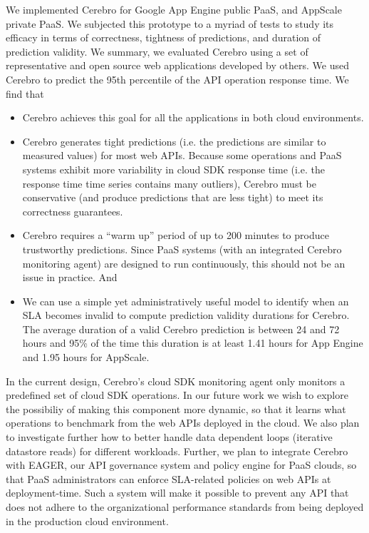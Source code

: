 We implemented Cerebro for Google App Engine public PaaS, 
and AppScale private PaaS. We subjected this
prototype to a myriad of tests to study its efficacy in terms of
correctness, tightness of predictions, and duration of prediction 
validity.  We summary, we evaluated Cerebro using a set of representative
and open source web applications developed by others.  We used Cerebro to
predict the 95th percentile of the API operation response time. 
We find that
\begin{itemize}
\vspace{-0.05in}
\item Cerebro achieves this goal for all the applications in both cloud environments.
\vspace{-0.05in}
\item Cerebro generates tight predictions (i.e.
the predictions are similar to measured values) for most web APIs.  Because
some operations and PaaS systems exhibit more variability in cloud SDK response
time (i.e. the response time time series contains many outliers), 
Cerebro must be conservative (and produce predictions that are less tight)
to meet its correctness guarantees.  
\vspace{-0.05in}
\item Cerebro requires a ``warm up'' period of up to 200 minutes to produce trustworthy predictions. Since PaaS systems (with an integrated Cerebro monitoring agent) are designed to run continuously, this should not be an issue in practice. And
\vspace{-0.05in}
\item We can use a simple yet administratively useful model to identify when an 
SLA becomes invalid to compute
prediction validity durations for Cerebro.  The average duration of a valid
Cerebro prediction is between 24 and 72 hours
and 95\% of the time this duration is at least 
1.41 hours for App Engine and 1.95 hours for AppScale.
\vspace{-0.05in}
\end{itemize}

In the current design, Cerebro's cloud SDK monitoring agent only monitors 
a predefined set of cloud SDK operations. In our future work we wish 
to explore the possibiliy of making this component more dynamic,
so that it learns what operations to benchmark from the web APIs 
deployed in the cloud. We also plan to investigate further how to better
handle data dependent loops (iterative datastore reads) for different workloads. 
Further, we plan
to integrate Cerebro with EAGER, our API governance system 
and policy engine for PaaS clouds, so 
that PaaS administrators can enforce SLA-related policies on web APIs at deployment-time.
Such a system will make it possible to prevent any API that 
does not adhere to the organizational performance
standards from being deployed in the production cloud environment.
